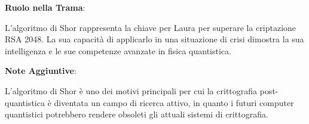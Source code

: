 \begin{tcolorbox}[colback=white,colframe=black,title=\textbf{Algoritmo di Shor}]
\begin{multicols}{2}
\textbf{Ruolo nella Trama}:

L'algoritmo di Shor rappresenta la chiave per Laura per superare la criptazione RSA 2048. La sua capacità di applicarlo in una situazione di crisi dimostra la sua intelligenza e le sue competenze avanzate in fisica quantistica.

\textbf{Note Aggiuntive}:

L'algoritmo di Shor è uno dei motivi principali per cui la crittografia post-quantistica è diventata un campo di ricerca attivo, in quanto i futuri computer quantistici potrebbero rendere obsoleti gli attuali sistemi di crittografia.

\end{multicols}
\end{tcolorbox}

\vspace{0.5cm}


